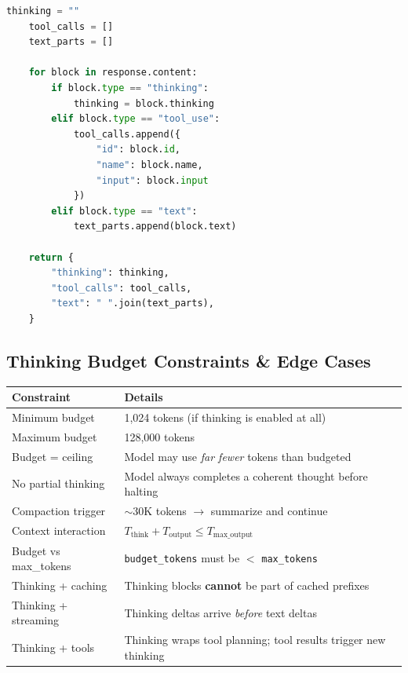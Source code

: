 \documentclass[11pt,a4paper]{article}
\begin{document}
\begin{lstlisting}[language=Python, caption={Fast Mode with Tools: No Thinking Overhead}]
    thinking = ""
    tool_calls = []
    text_parts = []
    
    for block in response.content:
        if block.type == "thinking":
            thinking = block.thinking
        elif block.type == "tool_use":
            tool_calls.append({
                "id": block.id,
                "name": block.name,
                "input": block.input
            })
        elif block.type == "text":
            text_parts.append(block.text)
    
    return {
        "thinking": thinking,
        "tool_calls": tool_calls,
        "text": " ".join(text_parts),
    }
\end{lstlisting}

\subsection{Thinking Budget Constraints \& Edge Cases}

\begin{center}
\begin{tabular}{L{4cm}L{10cm}}
\toprule
\textbf{Constraint} & \textbf{Details} \\
\midrule
Minimum budget & 1,024 tokens (if thinking is enabled at all) \\
Maximum budget & 128,000 tokens \\
Budget = ceiling & Model may use \textit{far fewer} tokens than budgeted \\
No partial thinking & Model always completes a coherent thought before halting \\
Compaction trigger & $\sim$30K tokens $\to$ summarize and continue \\
Context interaction & $T_{\text{think}} + T_{\text{output}} \leq T_{\text{max\_output}}$ \\
Budget vs max\_tokens & \texttt{budget\_tokens} must be $<$ \texttt{max\_tokens} \\
Thinking + caching & Thinking blocks \textbf{cannot} be part of cached prefixes \\
Thinking + streaming & Thinking deltas arrive \textit{before} text deltas \\
Thinking + tools & Thinking wraps tool planning; tool results trigger new thinking \\
\bottomrule
\end{tabular}
\end{center}
\end{document}
